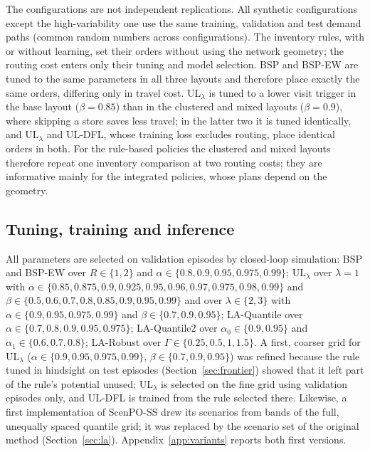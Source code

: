 The configurations are not independent replications. All synthetic configurations except the high-variability one use the same training, validation and test demand paths (common random numbers across configurations). The inventory rules, with or without learning, set their orders without using the network geometry; the routing cost enters only their tuning and model selection. BSP and BSP-EW are tuned to the same parameters in all three layouts and therefore place exactly the same orders, differing only in travel cost. UL$_\lambda$ is tuned to a lower visit trigger in the base layout ($\beta=0.85$) than in the clustered and mixed layouts ($\beta=0.9$), where skipping a store saves less travel; in the latter two it is tuned identically, and UL$_\lambda$ and UL-DFL, whose training loss excludes routing, place identical orders in both. For the rule-based policies the clustered and mixed layouts therefore repeat one inventory comparison at two routing costs; they are informative mainly for the integrated policies, whose plans depend on the geometry.

\subsection{Tuning, training and inference}

All parameters are selected on validation episodes by closed-loop simulation: BSP and BSP-EW over $R\in\{1,2\}$ and $\alpha\in\{0.8,0.9,0.95,0.975,0.99\}$; UL$_\lambda$ over $\lambda=1$ with $\alpha\in\{0.85,\allowbreak 0.875,\allowbreak 0.9,\allowbreak 0.925,\allowbreak 0.95,\allowbreak 0.96,\allowbreak 0.97,\allowbreak 0.975,\allowbreak 0.98,\allowbreak 0.99\}$ and $\beta\in\{0.5,\allowbreak 0.6,\allowbreak 0.7,\allowbreak 0.8,\allowbreak 0.85,\allowbreak 0.9,\allowbreak 0.95,\allowbreak 0.99\}$ and over $\lambda\in\{2,3\}$ with $\alpha\in\{0.9,0.95,0.975,0.99\}$ and $\beta\in\{0.7,0.9,0.95\}$; LA-Quantile over $\alpha\in\{0.7,0.8,0.9,0.95,0.975\}$; LA-Quantile2 over $\alpha_0\in\{0.9,0.95\}$ and $\alpha_1\in\{0.6,0.7,0.8\}$; LA-Robust over $\Gamma\in\{0.25,0.5,1,1.5\}$. A first, coarser grid for UL$_\lambda$ ($\alpha\in\{0.9,0.95,0.975,0.99\}$, $\beta\in\{0.7,0.9,0.95\}$) was refined because the rule tuned in hindsight on test episodes (Section~\ref{sec:frontier}) showed that it left part of the rule's potential unused; UL$_\lambda$ is selected on the fine grid using validation episodes only, and UL-DFL is trained from the rule selected there. Likewise, a first implementation of ScenPO-SS drew its scenarios from bands of the full, unequally spaced quantile grid; it was replaced by the scenario set of the original method (Section~\ref{sec:la}). Appendix~\ref{app:variants} reports both first versions.

